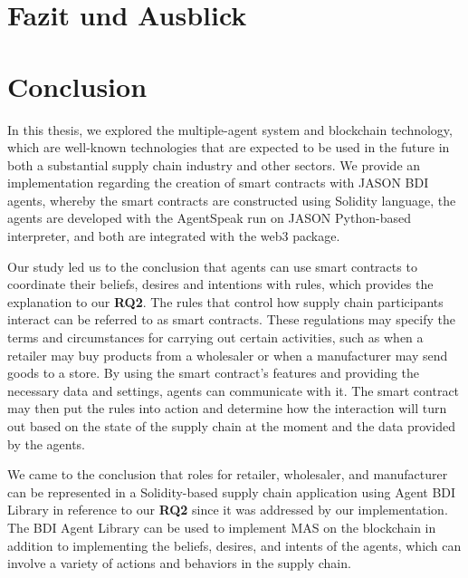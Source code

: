{\chapter{Fazit und Ausblick}}
{\chapter{Conclusion}}

\label{sec:conclusion}

In this thesis, we explored the multiple-agent system and blockchain technology, which are well-known technologies that are expected to be used in the future in both a substantial supply chain industry and other sectors. We provide an implementation regarding the creation of smart contracts with JASON \ac{BDI} agents, whereby the smart contracts are constructed using Solidity language, the agents are developed with the AgentSpeak run on JASON Python-based interpreter, and both are integrated with the web3 package. 

\vspace{.5cm}
Our study led us to the conclusion that agents can use smart contracts to coordinate their beliefs, desires and intentions with rules, which provides the explanation to our \textbf{RQ2}. The rules that control how supply chain participants interact can be referred to as smart contracts. These regulations may specify the terms and circumstances for carrying out certain activities, such as when a retailer may buy products from a wholesaler or when a manufacturer may send goods to a store. By using the smart contract's features and providing the necessary data and settings, agents can communicate with it. The smart contract may then put the rules into action and determine how the interaction will turn out based on the state of the supply chain at the moment and the data provided by the agents.

\vspace{.5cm}

We came to the conclusion that roles for retailer, wholesaler, and manufacturer can be represented in a Solidity-based supply chain application using Agent \ac{BDI} Library in reference to our \textbf{RQ2} since it was addressed by our implementation. The \ac{BDI} Agent Library can be used to implement \ac{MAS} on the blockchain in addition to implementing the beliefs, desires, and intents of the agents, which can involve a variety of actions and behaviors in the supply chain.

\vspace{.5cm}

